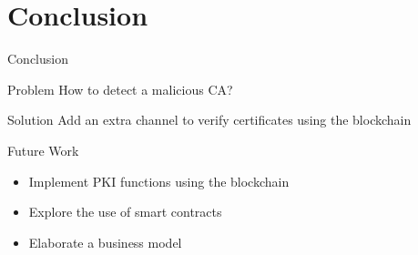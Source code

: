 \section[Conclusion]{Conclusion}
\begin{frame}{Conclusion}

\begin{alertblock}{Problem}
	How to detect a malicious CA?
\end{alertblock}

\begin{exampleblock}{Solution}
	Add an extra channel to verify certificates using the blockchain
\end{exampleblock}

\end{frame}

\begin{frame}{Future Work}

\begin{itemize}

\item Implement PKI functions using the blockchain

\item Explore the use of smart contracts

\item Elaborate a business model

\end{itemize}

\end{frame}

